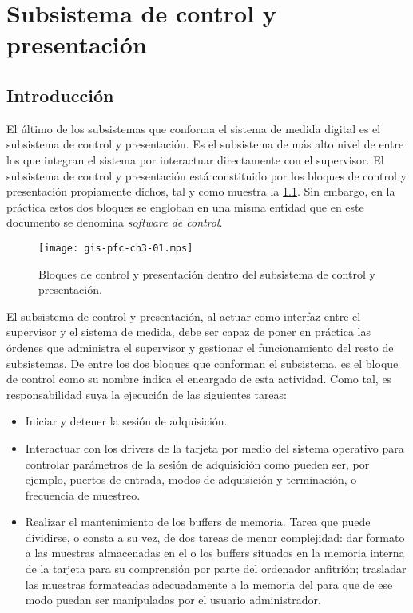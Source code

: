 \chapter{Subsistema de control y presentación}

\section{Introducción}

El último de los subsistemas que conforma el sistema de medida digital es el subsistema de control y presentación. Es el subsistema de más alto nivel de entre los que integran el sistema por interactuar directamente con el supervisor. El subsistema de control y presentación está constituido por los bloques de control y presentación propiamente dichos, tal y como muestra la \cref{fig:subconpre}. Sin embargo, en la práctica estos dos bloques se engloban en una misma entidad que en este documento se denomina \emph{software de control}.\par

\begin{figure}
	\begin{center}
		\texttt{[image: gis-pfc-ch3-01.mps]}
	\end{center}
	\caption[Subsistema de control y presentación]{Bloques de control y presentación dentro del subsistema de control y presentación.}
	\label{fig:subconpre}
\end{figure}

El subsistema de control y presentación, al actuar como interfaz entre el supervisor y el sistema de medida, debe ser capaz de poner en práctica las órdenes que administra el supervisor y gestionar el funcionamiento del resto de subsistemas. De entre los dos bloques que conforman el subsistema, es el bloque de control como su nombre indica el encargado de esta actividad. Como tal, es responsabilidad suya la ejecución de las siguientes tareas:

\begin{itemize}
	\item Iniciar y detener la sesión de adquisición.
	\item Interactuar con los drivers de la tarjeta por medio del sistema operativo para controlar parámetros de la sesión de adquisición como pueden ser, por ejemplo, puertos de entrada, modos de adquisición y terminación, o frecuencia de muestreo.
	\item Realizar el mantenimiento de los buffers de memoria. Tarea que puede dividirse, o consta a su vez, de dos tareas de menor complejidad: dar formato a las muestras almacenadas en el o los buffers situados en la memoria interna de la tarjeta para su comprensión por parte del ordenador anfitrión; trasladar las muestras formateadas adecuadamente a la memoria del \pc{} para que de ese modo puedan ser manipuladas por el usuario administrador.
\end{itemize}

